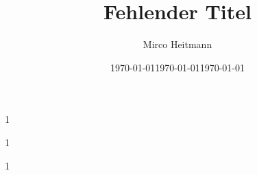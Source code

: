 \providecommand{\fontAtkinson}{0}
\providecommand{\fontFira}{0}
\providecommand{\fontRaleway}{0}

\providecommand{\marginTop}{15mm}
\providecommand{\marginBottom}{15mm}
\providecommand{\marginLeft}{35mm}
\providecommand{\marginRight}{25mm}


\usepackage{babel}
\usepackage{iflang}
\usepackage[top=\marginTop, bottom=\marginBottom, left=\marginLeft, right=\marginRight]{geometry}
\usepackage{amsmath}
\usepackage{anyfontsize}
\usepackage{setspace}
\usepackage{tabularray}
\usepackage{xcolor}
\usepackage{multirow}
\usepackage{graphicx}
\usepackage[export]{adjustbox}
\usepackage{titlesec}
\usepackage{parskip}
\usepackage[pdftex,
            pdfproducer={pdfLaTeX},
            pdfcreator={LaTeX},
            hidelinks,
            bookmarks]{hyperref}
\usepackage{xurl}
\usepackage{titling}
\usepackage{bookmark}
\usepackage{tocloft}
\usepackage{float}
\usepackage[noabbrev,nameinlink]{cleveref}
\usepackage{standalone}
\usepackage[useregional]{datetime2}
\usepackage{letltxmacro}
\usepackage[T1]{fontenc}

\if\fontAtkinson1
  \usepackage{arev}
  \usepackage[sfdefault]{atkinson}
\else
  \if\fontFira1
    \usepackage{arev}
    \usepackage[sfdefault,lining]{FiraSans}
    \usepackage[lining]{FiraMono}
  \else
    \if\fontRaleway1
      \usepackage{arev}
      \usepackage[default]{raleway}
    \else
      \usepackage{lmodern}
    \fi
  \fi
\fi

\graphicspath{{img/}}
\linespread{1.25}

\newcommand{\setTitle}[1]{
\hypersetup{pdftitle=#1}
\title{#1}
}

\newcommand{\setAuthor}[1]{
\hypersetup{pdfauthor=#1}
\author{#1}
}

\newcommand{\setDate}[1]{
\date{\ifx#1\today\today\else\DTMdate{#1}\fi}
}

\setTitle{Fehlender Titel}
\setAuthor{Mirco Heitmann}
\setDate{\today}

\newcommand{\intropage}[1]{
\pagenumbering{gobble}
{
\linespread{1.5}
#1
{\let\newpage\relax\maketitle}
}
\pagebreak
\pagenumbering{arabic}
}

